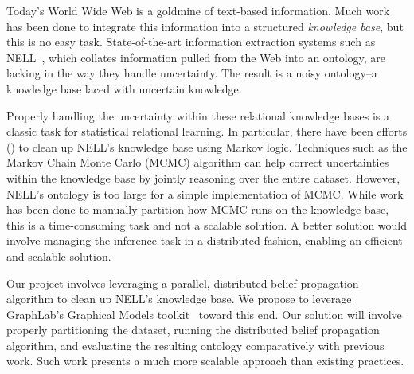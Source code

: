 Today's World Wide Web is a goldmine of text-based information.
Much work has been done to integrate this information into a structured
\emph{knowledge base}, but this is no easy task.
State-of-the-art information extraction systems such as NELL~\cite{carlson2010toward},
which collates information pulled from the Web into an ontology,
are lacking in the way they handle uncertainty.
The result is a noisy ontology--a knowledge base laced with uncertain knowledge.

Properly handling the uncertainty within these relational knowledge bases
is a classic task for statistical relational learning.
In particular, there have been efforts (\cite{lao2011random}) to clean up NELL's knowledge base
using Markov logic.
Techniques such as the Markov Chain Monte Carlo (MCMC) algorithm can help correct
uncertainties within the knowledge base by jointly reasoning over the entire dataset.
However, NELL's ontology is too large for a simple implementation of MCMC.
While work has been done to manually partition how MCMC runs on the knowledge base,
this is a time-consuming task and not a scalable solution.
A better solution would involve managing the inference task in a distributed fashion,
enabling an efficient and scalable solution.

Our project involves leveraging a parallel, distributed belief propagation algorithm
to clean up NELL's knowledge base.
We propose to leverage GraphLab's Graphical Models toolkit~\cite{low2010graphlab} toward this end.
Our solution will involve properly partitioning the dataset,
running the distributed belief propagation algorithm,
and evaluating the resulting ontology comparatively with previous work.
Such work presents a much more scalable approach than existing practices.


